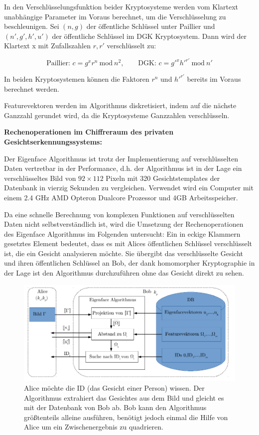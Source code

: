 In den Verschlüsselungsfunktion beider Kryptosysteme werden vom Klartext unabhängige Parameter im Voraus berechnet, um die Verschlüsselung zu beschleunigen. Sei $(n,g)$ der öffentliche Schlüssel unter Paillier und $(n',g',h',u')$ der öffentliche Schlüssel im DGK Kryptosystem. Dann wird der Klartext x mit Zufallszahlen $r,r'$ verschlüsselt zu:

\begin{equation*}
	\text{Paillier: } c = g^x r^n\ \text{mod}\ n^2, \qquad
	\text{DGK: } c = {g'}^x {h'}^{r'}\ \text{mod}\ n'
\end{equation*}

In beiden Kryptosystemen können die Faktoren $r^n$ und ${h'}^{r'}$ bereits im Voraus berechnet werden.

Featurevektoren werden im Algorithmus diskretisiert, indem auf die nächste Ganzzahl gerundet wird, da die Kryptosysteme Ganzzahlen verschlüsseln.

\textbf{Rechenoperationen im Chiffreraum des privaten Gesichtserkennungssystems:}

 Der Eigenface Algorithmus ist trotz der Implementierung auf verschlüsselten Daten vertretbar in der Performance, d.h. der Algorithmus ist in der Lage ein verschlüsseltes Bild von $92\times112$ Pixeln mit 320 Gesichtstemplates der Datenbank in vierzig Sekunden zu vergleichen. Verwendet wird ein Computer mit einem 2.4 GHz AMD Opteron Dualcore Prozessor und 4GB Arbeitsspeicher.
 
 Da eine schnelle Berechnung von komplexen Funktionen auf verschlüsselten Daten nicht selbstverständlich ist, wird die Umsetzung der Rechenoperationen des Eigenface Algorithmus im Folgenden untersucht: Ein in eckige Klammern gesetztes Element bedeutet, dass es mit Alices öffentlichen Schlüssel verschlüsselt ist, die ein Gesicht analysieren möchte. Sie übergibt das verschlüsselte Gesicht und ihren öffentlichen Schlüssel an Bob, der dank homomorpher Kryptographie in der Lage ist den Algorithmus durchzuführen ohne das Gesicht direkt zu sehen.

\begin{figure}[h] 
	\begin{center}
		\includegraphics{fig/Faces}
		\caption{Alice möchte die ID (das Gesicht einer Person) wissen. Der Algorithmus extrahiert das Gesichtes aus dem Bild und gleicht es mit der Datenbank von Bob ab. Bob kann den Algorithmus größtenteils alleine ausführen, benötigt jedoch einmal die Hilfe von Alice um ein Zwischenergebnis zu quadrieren.}
		\label{fig:Faces}
	\end{center}
\end{figure}

